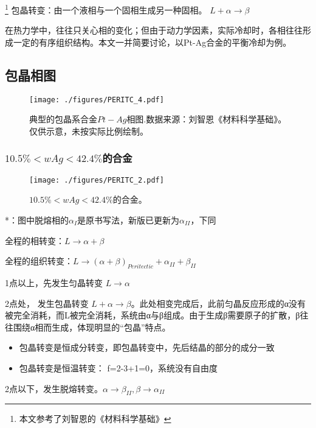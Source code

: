 
\footnote{本文参考了刘智恩的《材料科学基础》}
包晶转变：由一个液相与一个固相生成另一种固相。 $L + \alpha \rightarrow \beta$

在热力学中，往往只关心相的变化；但由于动力学因素，实际冷却时，各相往往形成一定的有序组织结构。本文一并简要讨论，以Pt-Ag合金的平衡冷却为例。

\subsection{包晶相图}

\begin{figure}[ht]
\centering
\texttt{[image: ./figures/PERITC\_4.pdf]}
\caption{典型的包晶系合金$Pt-Ag$相图.数据来源：刘智恩《材料科学基础》。仅供示意，未按实际比例绘制。} \label{PERITC_fig4}
\end{figure}

\subsubsection{$10.5\%<wAg<42.4\%$的合金} 
\begin{figure}[ht]
\centering
\texttt{[image: ./figures/PERITC\_2.pdf]}
\caption{$10.5\%<wAg<42.4\%$的合金。} \label{PERITC_fig2}
\end{figure}
*：图中脱熔相的$\alpha_I$是原书写法，新版已更新为$\alpha_{II}$，下同

全程的相转变：$L \rightarrow \alpha+\beta$

全程的组织转变：$L \rightarrow (\alpha+\beta)_{Peritectic} + \alpha_{II} + \beta_{II}$

1点以上，先发生匀晶转变 $L \rightarrow \alpha$

2点处， 发生包晶转变 $L+ \alpha \rightarrow \beta$。此处相变完成后，此前匀晶反应形成的α没有被完全消耗，而L被完全消耗，系统由α与β组成。由于生成β需要原子的扩散，β往往围绕α相而生成，体现明显的“包晶”特点。
\begin{itemize}
\item 包晶转变是恒成分转变，即包晶转变中，先后结晶的部分的成分一致
\item 包晶转变是恒温转变： f=2-3+1=0，系统没有自由度
\end{itemize}

2点以下，发生脱熔转变。$\alpha \rightarrow \beta_{II}, \beta \rightarrow \alpha_{II}$


